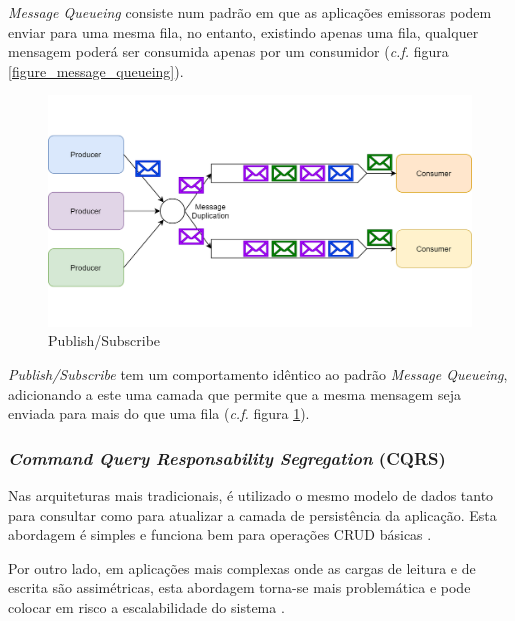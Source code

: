 \emph{Message Queueing} \label{message_queueing} consiste num padrão em que as aplicações emissoras podem enviar para uma mesma fila, no entanto, existindo  apenas uma fila, qualquer mensagem poderá ser consumida apenas por um consumidor (\emph{c.f.} figura \ref{figure_message_queueing}).

\begin{figure}[H]
    \begin{center}
    \includegraphics[width=1\textwidth]{figures/pub_sub.png}
    \caption{Publish/Subscribe}
    \label{figure_publish_subscribe}
    \end{center}
\end{figure}

\emph{Publish/Subscribe} \label{publish_subscribe} tem um comportamento idêntico ao padrão \emph{Message Queueing}, adicionando a este uma camada que permite que a mesma mensagem seja enviada para mais do que uma fila (\emph{c.f.} figura \ref{figure_publish_subscribe}).

\subsubsection{\emph{Command Query Responsability Segregation} (CQRS)} \label{cqrs}
Nas arquiteturas mais tradicionais, é utilizado o mesmo modelo de dados tanto para consultar como para atualizar a camada de persistência da aplicação. Esta abordagem é simples e funciona bem para operações CRUD básicas \cite{microservices_flexible_software_architecture}.

Por outro lado, em aplicações mais complexas onde as cargas de leitura e de escrita são assimétricas, esta abordagem torna-se mais problemática e pode colocar em risco a escalabilidade do sistema \cite{microservices_up_and_running}.

